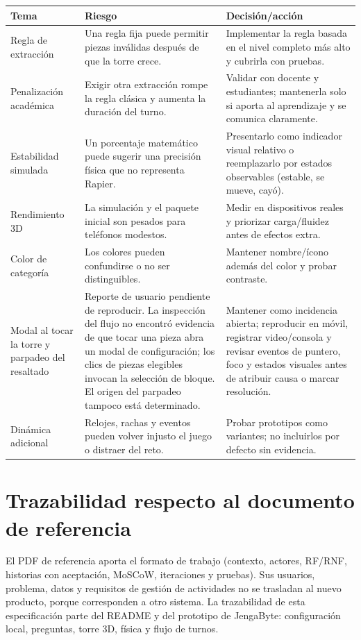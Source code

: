 \documentclass[11pt,letterpaper]{article}
\begin{document}
\begin{longtable}{@{}p{.20\linewidth}p{.36\linewidth}p{.28\linewidth}@{}}
\toprule
\textbf{Tema} & \textbf{Riesgo} & \textbf{Decisión/acción} \\
\midrule
Regla de extracción & Una regla fija puede permitir piezas inválidas después de que la torre crece. & Implementar la regla basada en el nivel completo más alto y cubrirla con pruebas. \\
Penalización académica & Exigir otra extracción rompe la regla clásica y aumenta la duración del turno. & Validar con docente y estudiantes; mantenerla solo si aporta al aprendizaje y se comunica claramente. \\
Estabilidad simulada & Un porcentaje matemático puede sugerir una precisión física que no representa Rapier. & Presentarlo como indicador visual relativo o reemplazarlo por estados observables (estable, se mueve, cayó). \\
Rendimiento 3D & La simulación y el paquete inicial son pesados para teléfonos modestos. & Medir en dispositivos reales y priorizar carga/fluidez antes de efectos extra. \\
Color de categoría & Los colores pueden confundirse o no ser distinguibles. & Mantener nombre/ícono además del color y probar contraste. \\
Modal al tocar la torre y parpadeo del resaltado & Reporte de usuario pendiente de reproducir. La inspección del flujo no encontró evidencia de que tocar una pieza abra un modal de configuración; los clics de piezas elegibles invocan la selección de bloque. El origen del parpadeo tampoco está determinado. & Mantener como incidencia abierta; reproducir en móvil, registrar video/consola y revisar eventos de puntero, foco y estados visuales antes de atribuir causa o marcar resolución. \\
Dinámica adicional & Relojes, rachas y eventos pueden volver injusto el juego o distraer del reto. & Probar prototipos como variantes; no incluirlos por defecto sin evidencia. \\
\bottomrule
\end{longtable}

\section{Trazabilidad respecto al documento de referencia}

El PDF de referencia aporta el formato de trabajo (contexto, actores, RF/RNF, historias con aceptación, MoSCoW, iteraciones y pruebas). Sus usuarios, problema, datos y requisitos de gestión de actividades no se trasladan al nuevo producto, porque corresponden a otro sistema. La trazabilidad de esta especificación parte del README y del prototipo de JengaByte: configuración local, preguntas, torre 3D, física y flujo de turnos.
\end{document}
